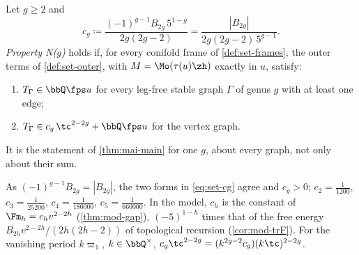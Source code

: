 \begin{defn}[Property N($g$)]
\label{def:set-N}
Let $g\geq2$ and
\begin{equation}
\label{eq:set-cg}
c_g\coloneqq\frac{(-1)^{g-1}B_{2g}\,5^{1-g}}{2g(2g-2)}=\frac{|B_{2g}|}{2g(2g-2)\,5^{g-1}} .
\end{equation}
\emph{Property N($g$)} holds if, for every conifold frame of \cref{def:set-frames}, the outer terms of \cref{def:set-outer}, with $M=\Mo(\tau(u)\zh)$ exactly in $u$, satisfy:
\begin{enumerate}
\item $T_\Gamma\in\bbQ\fps u$ for every leg-free stable graph $\Gamma$ of genus $g$ with at least one edge;
\item $T_\Gamma\in c_g\,\tc^{2-2g}+\bbQ\fps u$ for the vertex graph.
\end{enumerate}
It is the statement of \cref{thm:mai-main} for one $g$, about every graph, not only about their sum.
\end{defn}

\begin{rmk}
\label{rmk:set-cg}
As $(-1)^{g-1}B_{2g}=|B_{2g}|$, the two forms in \eqref{eq:set-cg} agree and $c_g>0$; $c_2=\frac1{1200}$, $c_3=\frac1{25200}$, $c_4=\frac1{180000}$, $c_5=\frac1{660000}$. In the model, $c_h$ is the constant of $\Fm_h=c_hv^{2-2h}$ (\cref{thm:mod-gap}), $(-5)^{1-h}$ times that of the free energy $B_{2h}v^{2-2h}/(2h(2h-2))$ of topological recursion (\cref{cor:mod-trF}). For the vanishing period $k\varpi_1$, $k\in\bbQ^\times$, $c_g\tc^{2-2g}=(k^{2g-2}c_g)(k\tc)^{2-2g}$.
\end{rmk}
